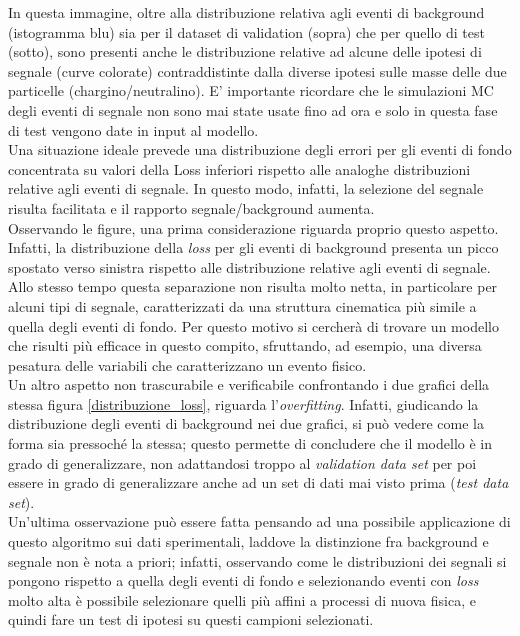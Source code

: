 In questa immagine, oltre alla distribuzione relativa agli eventi di background (istogramma blu) sia per il dataset di validation (sopra) che per quello di test (sotto), sono presenti anche le distribuzione relative ad alcune delle ipotesi di segnale (curve colorate) contraddistinte dalla diverse ipotesi sulle masse delle due particelle (chargino/neutralino). E' importante ricordare che le simulazioni MC degli eventi di segnale non sono mai state usate fino ad ora e solo in questa fase di test vengono date in input al modello. \\
Una situazione ideale prevede una distribuzione degli errori per gli eventi di fondo concentrata su valori della Loss inferiori rispetto alle analoghe distribuzioni relative agli eventi di segnale. In questo modo, infatti, la selezione del segnale risulta facilitata e il rapporto segnale/background aumenta.\\
Osservando le figure, una prima considerazione riguarda proprio questo aspetto. Infatti, la distribuzione della \textit{loss} per gli eventi di background presenta un picco spostato verso sinistra rispetto alle distribuzione relative agli eventi di segnale. Allo stesso tempo questa separazione non risulta molto netta, in particolare per alcuni tipi di segnale, caratterizzati da una struttura cinematica più simile a quella degli eventi di fondo. Per questo motivo si cercherà di trovare un modello che risulti più efficace in questo compito, sfruttando, ad esempio, una diversa pesatura delle variabili che caratterizzano un evento fisico.\\
Un altro aspetto non trascurabile e verificabile confrontando i due grafici della stessa figura \ref{distribuzione_loss}, riguarda l'\textit{overfitting}. Infatti, giudicando la distribuzione degli eventi di background nei due grafici, si può vedere come la forma sia pressoché la stessa; questo permette di concludere che il modello è in grado di generalizzare, non adattandosi troppo al \textit{validation data set} per poi essere in grado di generalizzare anche ad un set di dati mai visto prima (\textit{test data set}).\\
Un'ultima osservazione può essere fatta pensando ad una possibile applicazione di questo algoritmo sui dati sperimentali, laddove la distinzione fra background e segnale non è nota a priori; infatti, osservando come le distribuzioni dei segnali si pongono rispetto a quella degli eventi di fondo e selezionando eventi con \textit{loss} molto alta è possibile selezionare quelli più affini a processi di nuova fisica, e quindi fare un test di ipotesi su questi campioni selezionati.

